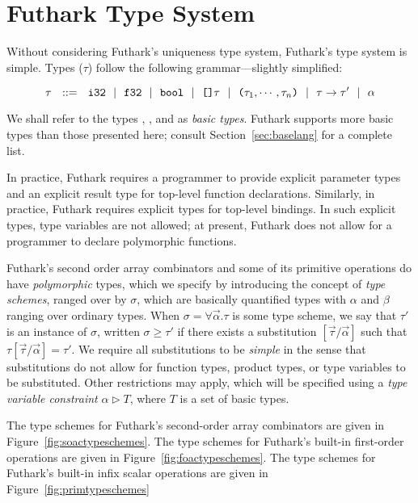 \documentclass[oneside,11pt]{book}
\begin{document}
\section{Futhark Type System}
Without considering Futhark's uniqueness type system, Futhark's type system is simple. Types ($\tau$) follow the following grammar---slightly simplified:

$$\tau ~~::=~~ \texttt{i32} ~~|~~ \texttt{f32} ~~|~~ \texttt{bool} ~~|~~ \texttt{[]}\tau ~~|~~ \texttt{(}\tau_1,\cdots,\tau_n\texttt{)} ~~|~~ \tau \rightarrow \tau' ~~|~~ \alpha$$

\noindent We shall refer to the types , , and  as
\emph{basic types}. Futhark supports more basic types than those
presented here; consult Section~\ref{sec:baselang} for a complete list.

In practice, Futhark requires a programmer to provide explicit
parameter types and an explicit result type for top-level function
declarations. Similarly, in practice, Futhark requires explicit types
for top-level  bindings. In such explicit types, type
variables are not allowed; at present, Futhark does not allow for a
programmer to declare polymorphic functions.

Futhark's second order array combinators and some of its primitive
operations do have \emph{polymorphic} types, which we specify by
introducing the concept of \emph{type schemes}, ranged over by $\sigma$,
which are basically quantified types with $\alpha$ and $\beta$ ranging
over ordinary types. When $\sigma=\forall\vec{\alpha}.\tau$ is some
type scheme, we say that $\tau'$ is an instance of $\sigma$, written
$\sigma \geq \tau'$ if there exists a substitution
$[\vec{\tau}/\vec{\alpha}]$ such that $\tau[\vec{\tau}/\vec{\alpha}] =
\tau'$. We require all substitutions to be \emph{simple} in the sense
that substitutions do not allow for function types, product types, or
type variables to be substituted. Other restrictions may apply, which
will be specified using a \emph{type variable constraint} $\alpha
\triangleright T$, where $T$ is a set of basic types.

The type schemes for Futhark's second-order array combinators are
given in Figure~\ref{fig:soactypeschemes}. The type schemes for
Futhark's built-in first-order operations are given in
Figure~\ref{fig:foactypeschemes}. The type schemes for Futhark's
built-in infix scalar operations are given in
Figure~\ref{fig:primtypeschemes}
\end{document}
